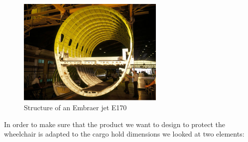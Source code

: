 \begin{figure}[h]
\centering
\includegraphics[width=7cm]{images/aircraft_structure.png}
\caption{Structure of an Embraer jet E170 \cite{embraer_struct}}
\label{fig:aircraft_structure}
\end{figure}

In order to make sure that the product we want to design to protect the wheelchair is adapted to the cargo hold dimensions we looked at two elements:

